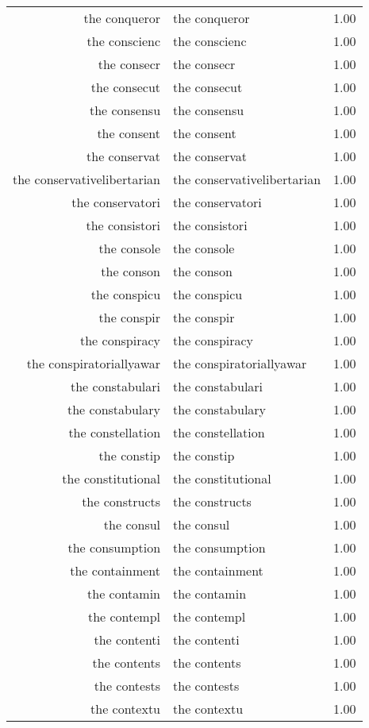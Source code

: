 \begin{table}[ht]
\begin{tabular}{rlr}
  the conqueror & the conqueror & 1.00 \\ 
  the conscienc & the conscienc & 1.00 \\ 
  the consecr & the consecr & 1.00 \\ 
  the consecut & the consecut & 1.00 \\ 
  the consensu & the consensu & 1.00 \\ 
  the consent & the consent & 1.00 \\ 
  the conservat & the conservat & 1.00 \\ 
  the conservativelibertarian & the conservativelibertarian & 1.00 \\ 
  the conservatori & the conservatori & 1.00 \\ 
  the consistori & the consistori & 1.00 \\ 
  the console & the console & 1.00 \\ 
  the conson & the conson & 1.00 \\ 
  the conspicu & the conspicu & 1.00 \\ 
  the conspir & the conspir & 1.00 \\ 
  the conspiracy & the conspiracy & 1.00 \\ 
  the conspiratoriallyawar & the conspiratoriallyawar & 1.00 \\ 
  the constabulari & the constabulari & 1.00 \\ 
  the constabulary & the constabulary & 1.00 \\ 
  the constellation & the constellation & 1.00 \\ 
  the constip & the constip & 1.00 \\ 
  the constitutional & the constitutional & 1.00 \\ 
  the constructs & the constructs & 1.00 \\ 
  the consul & the consul & 1.00 \\ 
  the consumption & the consumption & 1.00 \\ 
  the containment & the containment & 1.00 \\ 
  the contamin & the contamin & 1.00 \\ 
  the contempl & the contempl & 1.00 \\ 
  the contenti & the contenti & 1.00 \\ 
  the contents & the contents & 1.00 \\ 
  the contests & the contests & 1.00 \\ 
  the contextu & the contextu & 1.00 \\ 

\end{tabular}
\end{table}
